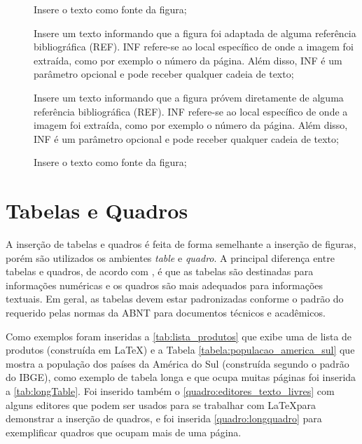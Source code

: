 \begin{description}

 \item[] Insere o texto  como fonte da figura;

 \item[] Insere um texto informando que a figura foi adaptada de alguma referência bibliográfica (REF). INF refere-se ao local específico de onde a imagem foi extraída, como por exemplo o número da página. Além disso, INF é um parâmetro opcional e pode receber qualquer cadeia de texto;

 \item[] Insere um texto informando que a figura próvem diretamente de alguma referência bibliográfica (REF). INF refere-se ao local específico de onde a imagem foi extraída, como por exemplo o número da página. Além disso, INF é um parâmetro opcional e pode receber qualquer cadeia de texto;
 
 \item[] Insere o texto  como fonte da figura;
 
\end{description}




\section{Tabelas e Quadros}
\label{secao:tabelas_e_quadros}

A inserção de tabelas e quadros é feita de forma semelhante a inserção de figuras, porém são utilizados os ambientes \textit{table} e \textit{quadro}. A principal diferença entre tabelas e quadros, de acordo com , é que as tabelas são destinadas para informações numéricas e os quadros são mais adequados para informações textuais. Em geral, as tabelas devem estar padronizadas conforme o padrão do  requerido pelas normas da ABNT para documentos técnicos e acadêmicos.

Como exemplos foram inseridas a \autoref{tab:lista_produtos} que exibe uma de lista de produtos (construída em \LaTeX) e a Tabela \autoref{tabela:populacao_america_sul} que mostra a população dos países da América do Sul (construída segundo o padrão do IBGE), como exemplo de tabela longa e que ocupa muitas páginas foi inserida a \autoref{tab:longTable}. Foi inserido também o \autoref{quadro:editores_texto_livres} com alguns editores que podem ser usados para se trabalhar com \LaTeX para demonstrar a inserção de quadros, e foi inserida \autoref{quadro:longquadro} para exemplificar quadros que ocupam mais de uma página.

